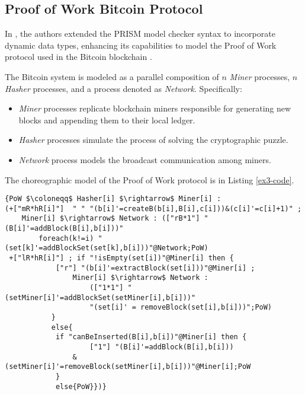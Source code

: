 \subsection{Proof of Work Bitcoin Protocol}
\begin{comment}
\begin{wrapfigure}[11]{r}{4cm}
	\texttt{[image: bitcoin.pdf]}	
\end{wrapfigure} 
\end{comment}
In \cite{DBLP:journals/concurrency/BistarelliNGLMV23}, the authors extended the PRISM model checker syntax to incorporate dynamic data types, enhancing its capabilities to model the Proof of Work protocol used in the Bitcoin blockchain \cite{bitcoin}. 

The Bitcoin system is modeled as a parallel composition of $n$ \emph{Miner} processes, $n$ \emph{Hasher} processes, and a process denoted as \emph{Network}. Specifically:
\begin{itemize}
\item \emph{Miner} processes replicate blockchain miners responsible for generating new blocks and appending them to their local ledger.
\item \emph{Hasher} processes simulate the process of solving the cryptographic puzzle.
\item \emph{Network} process models the broadcast communication among miners.
\end{itemize}
The choreographic model of the Proof of Work protocol is in Listing \ref{ex3-code}.
\begin{lstlisting}[style=chor-color,breaklines=true, postbreak=\mbox{\textcolor{red}{$\hookrightarrow$}\space},caption={Choreography for the Proof of Work Bitcoin Protocol},captionpos=b,label={ex3-code}]
{PoW $\coloneqq$ Hasher[i] $\rightarrow$ Miner[i] :
(+["mR*hR[i]"]  " " "(b[i]'=createB(b[i],B[i],c[i]))&(c[i]'=c[i]+1)" ; 
	Miner[i] $\rightarrow$ Network : (["rB*1"] "(B[i]'=addBlock(B[i],b[i]))"   
		foreach(k!=i) "(set[k]'=addBlockSet(set[k],b[i]))"@Network;PoW)
 +["lR*hR[i]"] ; if "!isEmpty(set[i])"@Miner[i] then { 
  	   		["r"] "(b[i]'=extractBlock(set[i]))"@Miner[i] ;  
				Miner[i] $\rightarrow$ Network : 
					(["1*1"] "(setMiner[i]'=addBlockSet(setMiner[i],b[i]))"
		 			"(set[i]' = removeBlock(set[i],b[i]))";PoW) 
 		   }
 		   else{
 	   		if "canBeInserted(B[i],b[i])"@Miner[i] then { 
 	      			["1"] "(B[i]'=addBlock(B[i],b[i]))
				&(setMiner[i]'=removeBlock(setMiner[i],b[i]))"@Miner[i];PoW 
 	   		}
	   		else{PoW}})} 
\end{lstlisting}
